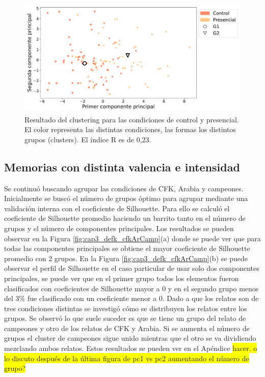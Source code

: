 \begin{figure}[h]
    \centering
    \includegraphics[width = 15cm]{figures/ch03/PCA_clustering/Primer tiempo/presvscontrol_NOenespaciocosine_PC1vsPC2_markersclusters_colortemas.pdf} 
    \caption{Resultado del clustering para las condiciones de control y presencial. El color representa las distintas condiciones, las formas los distintos grupos (clusters). El índice R es de 0,23.}
\label{fig:cap3_PC1vsPC2presycontrol}
\end{figure}


\subsection{Memorias con distinta valencia e intensidad}
\label{sec:PCscamparCFK}

Se continuó buscando agrupar las condiciones de CFK, Arabia y campeones.  Inicialmente se buscó el número de grupos óptimo para agrupar mediante una validación interna con el coeficiente de Silhouette. Para ello se calculó el coeficiente de Silhouette promedio haciendo un barrito tanto en el número de grupos y el número de componentes principales. Los resultados se pueden observar en la Figura \ref{fig:cap3_defk_cfkArCamp}(a) donde se puede ver que para todas las componentes principales se obtiene el mayor coeficiente de Silhouette promedio con 2 grupos. En la Figura \ref{fig:cap3_defk_cfkArCamp}(b) se puede observar el perfil de Silhouette en el caso particular de usar solo dos componentes principales, se puede ver que en el primer grupo todos los elementos fueron clasificados con coeficientes de Silhouette mayor a 0 y en el segundo grupo menos del 3$\%$ fue clasificado con un coeficiente menor a 0. Dado a que los relatos son de tres condiciones distintas se investigó cómo se distribuyen los relatos entre los grupos. Se observó lo que suele suceder es que se tiene un grupo del relato de campeones y otro de los relatos de CFK y Arabia. Si se aumenta el número de grupos el cluster de campeones sigue unido mientras que el otro se va dividiendo mezclando ambos relatos. Estos resultados se pueden ver en el Apéndice \colorbox{yellow}{hacer. o lo discuto después de la última figura de pc1 vs pc2 aumentando el número de grupo?}


